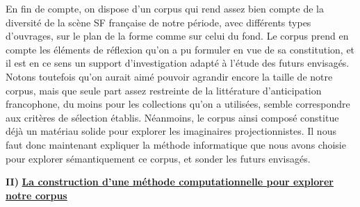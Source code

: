 \documentclass[letterpaper,portrait,12pt]{article}
\begin{document}
	En fin de compte, on dispose d'un corpus qui rend assez bien compte de la diversit\'{e} de la sc\`{e}ne SF fran\c{c}aise de notre p\'{e}riode, avec diff\'{e}rents types d'ouvrages, sur le plan de la forme comme sur celui du fond. Le corpus prend en compte les \'{e}l\'{e}ments de r\'{e}flexion qu'on a pu formuler en vue de sa constitution, et il est en ce sens un support d'investigation adapt\'{e} \`{a} l'\'{e}tude des futurs envisag\'{e}s. Notons toutefois qu'on aurait aim\'{e} pouvoir agrandir encore la taille de notre corpus, mais que seule part assez restreinte de la litt\'{e}rature d'anticipation francophone, du moins pour les collections qu'on a utilis\'{e}es, semble correspondre aux crit\`{e}res de s\'{e}lection \'{e}tablis. N\'{e}anmoins, le corpus ainsi compos\'{e} constitue d\'{e}j\`{a} un mat\'{e}riau solide pour explorer les imaginaires projectionnistes. Il nous faut donc maintenant expliquer la m\'{e}thode informatique que nous avons choisie pour explorer s\'{e}mantiquement ce corpus, et sonder les futurs envisag\'{e}s.





\newpage






\newpage



\textbf{II) }\textbf{\uline{La construction d'une m\'{e}thode computationnelle pour explorer notre corpus}}
\end{document}
